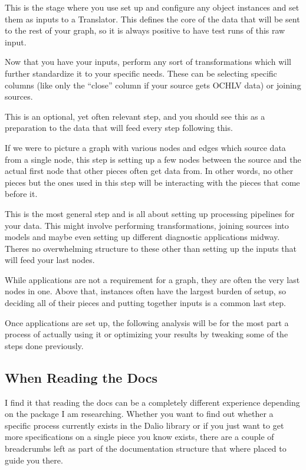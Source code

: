 \documentclass[letterpaper,10pt,english]{sphinxmanual}
\begin{document}

This is the stage where you use set up and configure any  object instances and set them as inputs to a Translator. This defines the core of the data that will be sent to the rest of your graph, so it is always positive to have test runs of this raw input.


Now that you have your inputs, perform any sort of transformations which will further standardize it to your specific needs. These can be selecting specific columns (like only the “close” column if your source gets OCHLV data) or joining sources.

This is an optional, yet often relevant step, and you should see this as a preparation to the data that will feed every step following this.

If we were to picture a graph with various nodes and edges which source data from a single node, this step is setting up a few nodes between the source and the actual first node that other pieces often get data from. In other words, no other pieces but the ones used in this step will be interacting with the pieces that come before it.


This is the most general step and is all about setting up processing pipelines for your data. This might involve performing transformations, joining sources into models and maybe even setting up different diagnostic applications midway. Theres no overwhelming structure to these other than setting up the inputs that will feed your last nodes.


While applications are not a requirement for a graph, they are often the very last nodes in one. Above that,  instances often have the largest burden of setup, so deciding all of their pieces and putting together inputs is a common last step.

Once applications are set up, the following analysis will be for the most part a process of actually using it or optimizing your results by tweaking some of the steps done previously.


\subsection{When Reading the Docs}
\label{\detokenize{beginners-guide:when-reading-the-docs}}
I find it that reading the docs can be a completely different experience depending on the package I am researching. Whether you want to find out whether a specific process currently exists in the Dal\sphinxhyphen{}io library or if you just want to get more specifications on a single piece you know exists, there are a couple of breadcrumbs left as part of the documentation structure that where placed to guide you there.
\end{document}
